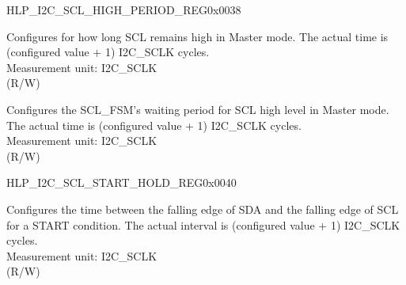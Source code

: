     
    \begin{register}{H}{LP\_I2C\_SCL\_HIGH\_PERIOD\_REG}{0x0038}\label{regdesc:LPI2CSCLHIGHPERIODREG}
    \regnewline%
    \begin{regdesc}\begin{reglist}
    \label{fielddesc:LPI2CSCLHIGHPERIOD}\item [LP\_I2C\_SCL\_HIGH\_PERIOD] Configures for how long SCL remains high in Master mode. The actual time is (configured value + 1) I2C\_SCLK cycles.\\
Measurement unit: I2C\_SCLK \\ (R/W)
    \label{fielddesc:LPI2CSCLWAITHIGHPERIOD}\item [LP\_I2C\_SCL\_WAIT\_HIGH\_PERIOD] Configures the SCL\_FSM's waiting period for SCL high level in Master mode. The actual time is (configured value + 1) I2C\_SCLK cycles.\\
Measurement unit: I2C\_SCLK \\ (R/W)
    \end{reglist}\end{regdesc}
    \end{register}
    
    
    \begin{register}{H}{LP\_I2C\_SCL\_START\_HOLD\_REG}{0x0040}\label{regdesc:LPI2CSCLSTARTHOLDREG}
    \regnewline%
    \begin{regdesc}\begin{reglist}
    \label{fielddesc:LPI2CSCLSTARTHOLDTIME}\item [LP\_I2C\_SCL\_START\_HOLD\_TIME] Configures the time between the falling edge of SDA and the falling edge of SCL for a START condition. The actual interval is (configured value + 1) I2C\_SCLK cycles.\\
Measurement unit: I2C\_SCLK \\ (R/W)
    \end{reglist}\end{regdesc}
    \end{register}
    
